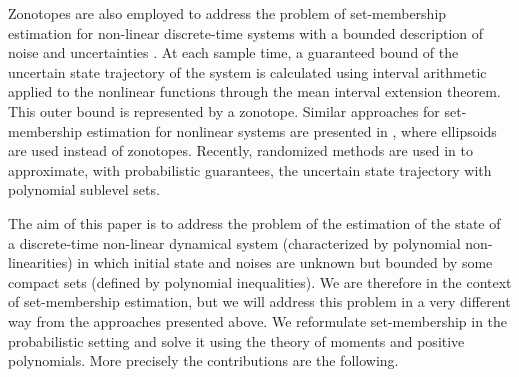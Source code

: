 \documentclass[twocolumn]{autart}
\newcommand{\DP}[1]{{#1}}
\begin{document}
Zonotopes are also employed to address the problem of  set-membership estimation
for non-linear discrete-time systems with a bounded description of noise and uncertainties \cite{Alamo03}.
At each sample time, a guaranteed bound of the uncertain state trajectory of the system
is calculated using interval arithmetic applied to the nonlinear functions
through the mean interval extension theorem.
This outer bound is represented by a zonotope.
Similar approaches for set-membership  estimation for nonlinear systems are presented in  \cite{calafiore2005reliable,el2001robust,Maier2009}, where
 ellipsoids  are used instead of zonotopes. \DP{Recently, randomized methods are used in \cite{dabbene2015randomized} to approximate, with probabilistic guarantees, the uncertain state trajectory with polynomial sublevel sets.}


The aim of this paper is to address the problem of the estimation of
the state of a discrete-time non-linear dynamical system (characterized by polynomial non-linearities)
in which initial state and noises are unknown but bounded by some compact sets (defined by polynomial inequalities).
We are therefore in the context of set-membership estimation,
but we will address this problem in a very different way
from the approaches presented above.
We reformulate set-membership in the probabilistic setting and solve it using the theory of moments
and positive polynomials.
More precisely the contributions  are the following.
\end{document}
